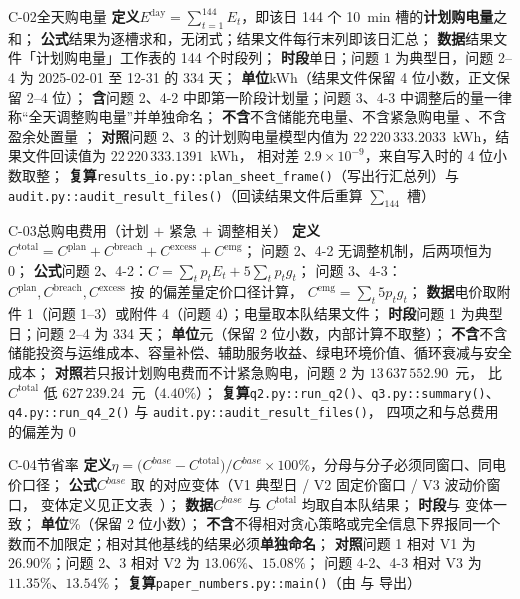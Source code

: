 \begin{caliber}{C-02}{全天购电量}
\textbf{定义}\quad \(E^{\text{day}}=\sum_{t=1}^{144}E_t\)，即该日 144 个 10~min 槽的\textbf{计划购电量}之和；%
\textbf{公式}\quad 结果为逐槽求和，无闭式；结果文件每行末列即该日汇总；%
\textbf{数据}\quad 结果文件「计划购电量」工作表的 144 个时段列；%
\textbf{时段}\quad 单日；问题 1 为典型日，问题 2--4 为 2025-02-01 至 12-31 的 334 天；%
\textbf{单位}\quad kWh（结果文件保留 4 位小数，正文保留 2--4 位）；%
\textbf{含}\quad 问题 2、4-2 中即第一阶段计划量；问题 3、4-3 中调整后的量一律称“全天调整购电量”并单独命名；%
\textbf{不含}\quad 不含储能充电量、不含紧急购电量 、不含盈余处置量 ；%
\textbf{对照}\quad 问题 2、3 的计划购电量模型内值为 \(22\,220\,333.2033\)~kWh，结果文件回读值为 \(22\,220\,333.1391\)~kWh，
相对差 \(2.9\times10^{-9}\)，来自写入时的 4 位小数取整；%
\textbf{复算}\quad \texttt{results\_io.py::plan\_sheet\_frame()}（写出行汇总列）与 \texttt{audit.py::audit\_result\_files()}（回读结果文件后重算 \(\sum_{144}\) 槽）
\end{caliber}

\begin{caliber}{C-03}{总购电费用（计划 \(+\) 紧急 \(+\) 调整相关）}
\textbf{定义}\quad \(C^{\text{total}}=C^{\text{plan}}+C^{\text{breach}}+C^{\text{excess}}+C^{\text{emg}}\)；
问题 2、4-2 无调整机制，后两项恒为 0；%
\textbf{公式}\quad 问题 2、4-2：\(C=\sum_tp_tE_t+5\sum_tp_tg_t\)；
问题 3、4-3：\(C^{\text{plan}},C^{\text{breach}},C^{\text{excess}}\) 按  的偏差量定价口径计算，
\(C^{\text{emg}}=\sum_t5p_tg_t\)；%
\textbf{数据}\quad 电价取附件 1（问题 1--3）或附件 4（问题 4）；电量取本队结果文件；%
\textbf{时段}\quad 问题 1 为典型日；问题 2--4 为 334 天；%
\textbf{单位}\quad 元（保留 2 位小数，内部计算不取整）；%
\textbf{不含}\quad 不含储能投资与运维成本、容量补偿、辅助服务收益、绿电环境价值、循环衰减与安全成本；%
\textbf{对照}\quad 若只报计划购电费而不计紧急购电，问题 2 为 \(13\,637\,552.90\)~元，
比 \(C^{\text{total}}\) 低 \(627\,239.24\)~元（\(4.40\%\)）；%
\textbf{复算}\quad \texttt{q2.py::run\_q2()}、\texttt{q3.py::summary()}、\texttt{q4.py::run\_q4\_2()} 与 \texttt{audit.py::audit\_result\_files()}，
四项之和与总费用的偏差为 0
\end{caliber}

\begin{caliber}{C-04}{节省率}
\textbf{定义}\quad \(\eta=\bigl(C^{base}-C^{\text{total}}\bigr)/C^{base}\times100\%\)，分母与分子必须同窗口、同电价口径；%
\textbf{公式}\quad \(C^{base}\) 取  的对应变体（V1 典型日 / V2 固定价窗口 / V3 波动价窗口，
变体定义见正文表~）；%
\textbf{数据}\quad \(C^{base}\) 与 \(C^{\text{total}}\) 均取自本队结果；%
\textbf{时段}\quad 与  变体一致；%
\textbf{单位}\quad \%（保留 2 位小数）；%
\textbf{不含}\quad 不得相对贪心策略或完全信息下界报同一个数而不加限定；相对其他基线的结果必须\textbf{单独命名}；%
\textbf{对照}\quad 问题 1 相对 V1 为 \(26.90\%\)；问题 2、3 相对 V2 为 \(13.06\%\)、\(15.08\%\)；
问题 4-2、4-3 相对 V3 为 \(11.35\%\)、\(13.54\%\)；%
\textbf{复算}\quad \texttt{paper\_numbers.py::main()}（由  与  导出）
\end{caliber}

